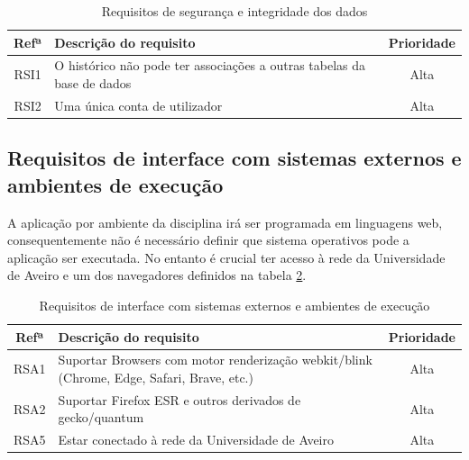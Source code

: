\documentclass[12pt, twoside]{report}
\begin{document}
\begin{table}[H]	
	\caption{Requisitos de segurança e integridade dos dados}
	
	
	\begin{center}
		\begin{tabularx}{\textwidth}{|c|X|c|}
			\hline
			\textbf{Refª }	& \textbf{Descrição do requisito} & \textbf{Prioridade} \\
			\hline
			RSI1 &O histórico não pode ter associações a outras tabelas da base de dados  &Alta\\
			\hline
			RSI2 & Uma única conta de utilizador&Alta\\
			\hline
		\end{tabularx}
		\label{requisitosdeseguranca}
	\end{center}
\end{table}


	\subsection{Requisitos de interface com sistemas externos e ambientes de execução}
	
	A aplicação por ambiente da disciplina irá ser programada em linguagens web,
	consequentemente não é necessário definir que sistema operativos pode a aplicação ser executada.
	No entanto é crucial ter acesso à rede da Universidade de Aveiro e um dos navegadores definidos na tabela \ref{requisitosdesistemas}.
	
	\def\arraystretch{1.5}
	\begin{table}[H]
		\caption{Requisitos de interface com sistemas externos e ambientes de execução}
		\begin{center}
			\begin{tabularx}{\textwidth}{|c|X|c|}
				\hline
				\textbf{Refª }	& \textbf{Descrição do requisito} & \textbf{Prioridade}\\
				\hline
				RSA1 & Suportar Browsers com motor renderização webkit/blink (Chrome, Edge, Safari, Brave, etc.)  & Alta \\
				\hline
				RSA2 & Suportar Firefox ESR e outros derivados de gecko/quantum & Alta \\
				\hline
				RSA5 & Estar conectado à rede da Universidade de Aveiro & Alta\\
				\hline
			\end{tabularx}
			\label{requisitosdesistemas}
		\end{center}
	\end{table}
		
\end{document}
